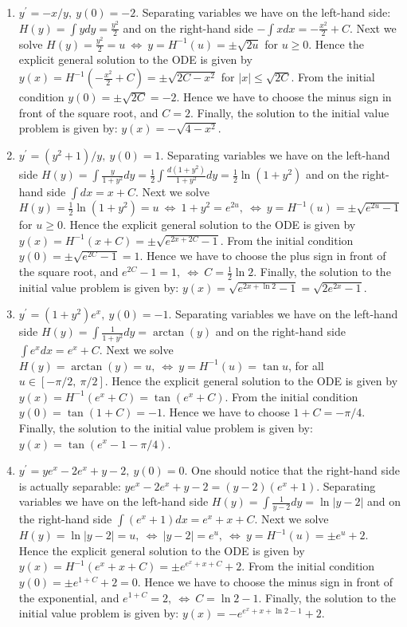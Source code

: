 \documentclass[11pt,a4paper,twoside]{article}
\begin{document}
	\begin{enumerate}[\bfseries 1)]
		\item $y^\prime = −x/y,\ y(0) = −2$.  Separating variables we have on the left-hand side: $H(y) = \int ydy = \frac{y^2}{2}$ and on the right-hand side $-\int x dx = -\frac{x^2}{2} + C$. Next we solve $H(y) = \frac{y^2}{2} = u\ \Leftrightarrow\ y = H^{-1}(u) = \pm \sqrt{2u}$ for $u \ge 0$. Hence the explicit general solution to the ODE is given by $y(x) = H^{-1}(-\frac{x^2}{2}+C)=\pm \sqrt{2C-x^2}$ for $\left\lvert x\right\rvert \le \sqrt{2C}$. From the initial condition $y(0) = \pm \sqrt{2C} = -2$. Hence we have to choose the minus sign in front of the square root, and $C = 2$. Finally, the solution to the initial value problem is given by: $y(x)=-\sqrt{4-x^2}$.
		\item $y^\prime = (y^2 + 1)/y,\ y(0) = 1$. Separating variables we have on the left-hand side $H(y) = \int \frac{y}{1+y^2}dy = \frac{1}{2}\int \frac{d(1+y^2)}{1+y^2}dy = \frac{1}{2}\ln (1+y^2)$ and on the right-hand side $\int dx = x+C$. Next we solve $H(y)=\frac{1}{2}\ln (1+y^2) = u\ \Leftrightarrow\ 1 + y^2 = e^{2u},\ \Leftrightarrow\ y = H^{-1}(u)=\pm \sqrt{e^{2u}-1}$ for $u \ge 0$. Hence the explicit general solution to the ODE is given by $y(x) = H^{-1}(x+C) = \pm \sqrt{e^{2x+2C}-1}$. From the initial condition $y(0) = \pm \sqrt{e^{2C}-1} = 1$. Hence we have to choose the plus sign in front of the square root, and $e^{2C}-1=1,\ \Leftrightarrow\ C = \frac{1}{2}\ln 2$. Finally, the solution to the initial value problem is given by: $y(x) = \sqrt{e^{2x+\ln2}-1} = \sqrt{2e^{2x}-1}$.
		\item $y^\prime = (1+y^2)e^x,\ y(0) = -1$. Separating variables we have on the left-hand side $H(y) = \int \frac{1}{1+y^2}dy = \arctan(y)$ and on the right-hand side $\int e^x dx = e^x + C$. Next we solve $H(y) = \arctan(y) = u,\ \Leftrightarrow\ y = H^{-1}(u) = \tan u$, for all $u \in \left[-\pi/2,\ \pi/2\right]$. Hence the explicit general solution to the ODE is given by $y(x) = H^{-1}(e^x + C) = \tan(e^x + C)$. From the initial condition $y(0) = \tan(1+C)=-1$. Hence we have to choose $1 + C = -\pi/4$. Finally, the solution to the initial value problem is given by: $y(x) = \tan (e^x-1-\pi/4)$.
		\item $y^\prime = ye^x - 2e^x + y - 2,\ y(0) = 0$. One should notice that the right-hand side is actually separable: $ye^x - 2e^x + y - 2 = (y-2)(e^x+1)$. Separating variables we have on the left-hand side $H(y) = \int \frac{1}{y-2}dy = \ln \left\lvert y-2\right\rvert$ and on the right-hand side $\int (e^x + 1)dx = e^x + x + C$. Next we solve $H(y) = \ln \left\lvert y-2\right\rvert = u,\ \Leftrightarrow\ \left\lvert y-2\right\rvert = e^u,\ \Leftrightarrow\ y = H^{-1}(u) = \pm e^u + 2$. Hence the explicit general solution to the ODE is given by $y(x) = H^{-1}(e^x + x + C) = \pm e^{e^x+x+C}+2$.  From the initial condition $y(0) = \pm e^{1+C}+2 = 0$. Hence we have to choose the minus sign in front of the exponential, and $e^{1+C}=2,\ \Leftrightarrow\ C=\ln 2-1$. Finally, the solution to the initial value problem is given by: $y(x) = -e^{e^x+x+\ln 2-1}+2$.
	\end{enumerate}
\end{document}
